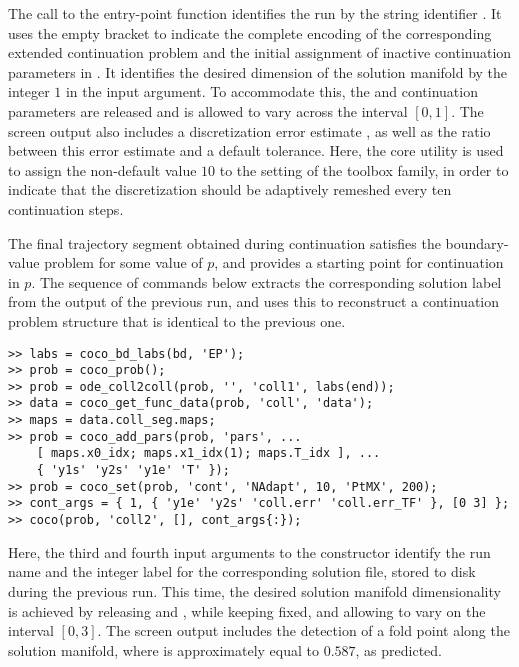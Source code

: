 The call to the  entry-point function identifies the run by the string identifier . It uses the empty bracket to indicate the complete encoding of the corresponding extended continuation problem and the initial assignment of inactive continuation parameters in . It identifies the desired dimension of the solution manifold by the integer $1$ in the  input argument. To accommodate this, the  and  continuation parameters are released and  is allowed to vary across the interval $[0,1]$. The screen output also includes a discretization error estimate , as well as the ratio  between this error estimate and a default tolerance. Here, the  core utility is used to assign the non-default value $10$ to the  setting of the  toolbox family, in order to indicate that the discretization should be adaptively remeshed every ten continuation steps.

The final trajectory segment obtained during continuation satisfies the boundary-value problem for some value of $p$, and provides a starting point for continuation in $p$. The sequence of commands below extracts the corresponding solution label from the  output of the previous run, and uses this to reconstruct a continuation problem structure that is identical to the previous one.
\begin{lstlisting}[language=coco-highlight]
>> labs = coco_bd_labs(bd, 'EP');
>> prob = coco_prob();
>> prob = ode_coll2coll(prob, '', 'coll1', labs(end));
>> data = coco_get_func_data(prob, 'coll', 'data');
>> maps = data.coll_seg.maps;
>> prob = coco_add_pars(prob, 'pars', ...
    [ maps.x0_idx; maps.x1_idx(1); maps.T_idx ], ...
    { 'y1s' 'y2s' 'y1e' 'T' });
>> prob = coco_set(prob, 'cont', 'NAdapt', 10, 'PtMX', 200);
>> cont_args = { 1, { 'y1e' 'y2s' 'coll.err' 'coll.err_TF' }, [0 3] };
>> coco(prob, 'coll2', [], cont_args{:});
\end{lstlisting}
Here, the third and fourth input arguments to the  constructor identify the run name and the integer label for the corresponding solution file, stored to disk during the previous run. This time, the desired solution manifold dimensionality is achieved by releasing  and , while keeping  fixed, and allowing  to vary on the interval $[0,3]$. The screen output includes the detection of a fold point along the solution manifold, where  is approximately equal to $0.587$, as predicted.

